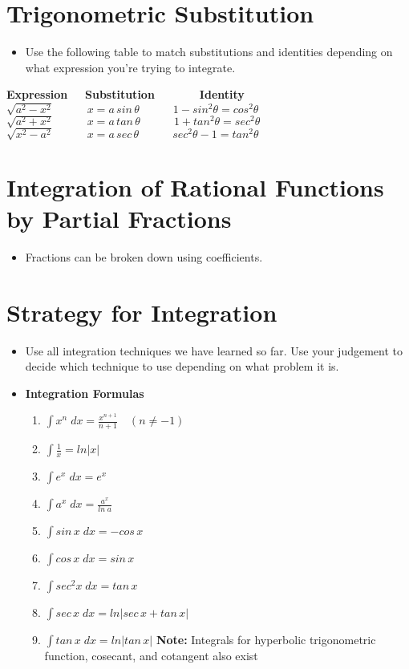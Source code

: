 \documentclass{report}
\begin{document}
	\section{Trigonometric Substitution}
		\begin{itemize}\addtolength{\leftskip}{2em}
			\item Use the following table to match substitutions and identities depending on what expression you're trying to integrate.
		\end{itemize}
		\addtolength{\leftskip}{6em}
			\textbf{Expression}\large$\quad\;\;$\textbf{Substitution}$\quad\quad\quad\quad$\textbf{Identity}\newline
			\large$\sqrt{a^2-x^2}\quad\quad\quad x=a\,sin\,\theta\quad\quad\quad 1-sin^2\theta =cos^2\theta$\newline
			\large$\sqrt{a^2+x^2}\quad\quad\quad x=a\,tan\,\theta\quad\quad\quad 1+tan^2\theta =sec^2\theta$\newline
			\large$\sqrt{x^2-a^2}\quad\quad\quad x=a\,sec\,\theta\quad\quad\quad sec^2\theta - 1 =tan^2\theta$
	\section{Integration of Rational Functions by Partial Fractions}
		\begin{itemize}\addtolength{\leftskip}{2em}
			\item Fractions can be broken down using coefficients.
		\end{itemize}
	\section{Strategy for Integration}
		\begin{itemize}\addtolength{\leftskip}{2em}
			\item Use all integration techniques we have learned so far. Use your judgement to decide which technique to use depending on what problem it is.
			\item \textbf{Integration Formulas}
			\begin{enumerate}\addtolength{\leftskip}{4em}
				\item \large$\int x^n\;dx=\frac{x^{n+1}}{n+1}\quad (n\ne -1)$ 
				\item \large$\int \frac{1}{x}=ln|x|$
				\item \large$\int e^x\;dx=e^x$
				\item \large$\int a^x\;dx=\frac{a^x}{ln\;a}$
				\item \large$\int sin\,x\;dx=-cos\,x$
				\item \large$\int cos\,x\;dx=sin\,x$
				\item \large$\int sec^2x\;dx=tan\,x$
				\item \large$\int sec\,x\;dx=ln|sec\,x+tan\,x|$
				\item \large$\int tan\,x\;dx=ln|tan\,x|$\newline
				\textbf{Note:} Integrals for hyperbolic trigonometric function, cosecant, and cotangent also exist
			\end{enumerate}
		\end{itemize}
	\setcounter{section}{+7}
\end{document}
